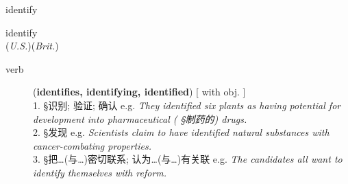 \documentclass[avery5372, grid]{flashcards}
\begin{document}
\begin{flashcard}[{\B  7 Habits} {\S 词汇}]{\Huge identify}
	\begin{center}
		{\LARGE i\textbullet den\textbullet ti\textbullet fy}\\
		(\textit{U.S.})\hspace{0.25cm}(\textit{Brit.})
	\end{center}
	\begin{description}
		
		\item[verb] (\textbf{identifies, identifying, identified}) [ with obj. ]\\
			1. {\S 识别; 验证; 确认} e.g. \textit{They identified six plants as having potential for development into pharmaceutical \textnormal{( {\S 制药的})} drugs.}\\
			2. {\S 发现} e.g. \textit{Scientists claim to have identified natural substances with cancer-combating properties.}\\
			3. {\S 把…(与…)密切联系; 认为…(与…)有关联} e.g. \textit{The candidates all want to identify themselves with reform.}
			
		
			
			
			
		
			

\end{description}
\end{flashcard}
\end{document}

